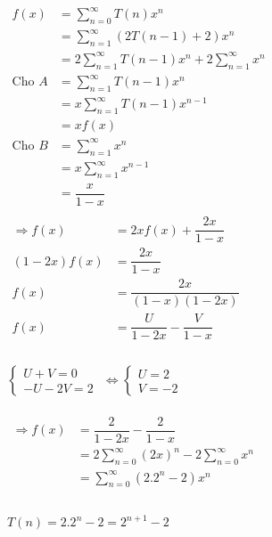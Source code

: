 \documentclass[12pt, letterpaper]{article}
\begin{document}
\begin{enumerate}
     \\
    $\begin{aligned}
        f(x) &= \sum_{n=0}^{\infty} T(n)x^n \\
            &= \sum_{n=1}^{\infty} (2T(n-1) + 2)x^n \\
            &= 2\sum_{n=1}^{\infty} T(n-1)x^{n} + 2\sum_{n=1}^{\infty} x^n \\
        \text{Cho } A &= \sum_{n=1}^{\infty} T(n-1)x^{n} \\
                    &= x\sum_{n=1}^{\infty} T(n-1)x^{n-1} \\
                    &= xf(x) \\
        \text{Cho } B &= \sum_{n=1}^{\infty} x^n \\
                    &= x\sum_{n=1}^{\infty} x^{n-1} \\
                    &= \dfrac{x}{1-x} \\
    \end{aligned}$ \\
    $\begin{aligned}
    \Rightarrow f(x) &= 2xf(x) + \dfrac{2x}{1-x} \\
                    (1-2x)f(x) &= \dfrac{2x}{1-x} \\
                    f(x) &= \dfrac{2x}{(1-x)(1-2x)} \\
                    f(x) &= \dfrac{U}{1-2x} - \dfrac{V}{1-x} \\
    \end{aligned}$ \\ \\

    $\begin{cases}
        U + V = 0 \\
        -U - 2V = 2
    \end{cases}$
    $\Leftrightarrow \begin{cases}
        U = 2 \\
        V = -2
    \end{cases}$ \\ \\

    $\begin{aligned}
        \Rightarrow f(x) &= \dfrac{2}{1-2x} - \dfrac{2}{1-x} \\
                        &= 2\sum_{n=0}^{\infty} (2x)^n - 2\sum_{n=0}^{\infty} x^n \\
                        &= \sum_{n=0}^{\infty} (2.2^n - 2)x^n \\
    \end{aligned}$ \\
     \\
    $T(n) = 2.2^n - 2 = 2^{n+1} - 2$
\end{enumerate}
\end{document}
